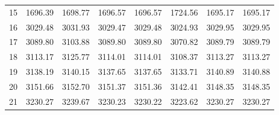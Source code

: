 \documentclass[10pt,oneside]{article}
\begin{document}
\begin{table}[h!]
\begin{tabular}{cccccccc}
15 &   1696.39 & 1698.77 & 1696.57 &    1696.57 &      1724.56 & 1695.17 &   1695.17 \\
16 &   3029.48 & 3031.93 & 3029.47 &    3029.48 &      3024.93 & 3029.95 &   3029.95 \\
17 &   3089.80 & 3103.88 & 3089.80 &    3089.80 &      3070.82 & 3089.79 &   3089.79 \\
18 &   3113.17 & 3125.77 & 3114.01 &    3114.01 &      3108.37 & 3113.27 &   3113.27 \\
19 &   3138.19 & 3140.15 & 3137.65 &    3137.65 &      3133.71 & 3140.89 &   3140.88 \\
20 &   3151.66 & 3152.70 & 3151.37 &    3151.36 &      3142.41 & 3148.35 &   3148.35 \\
21 &   3230.27 & 3239.67 & 3230.23 &    3230.22 &      3223.62 & 3230.27 &   3230.27 \\
\bottomrule
\end{tabular}
\end{table}
\end{document}
